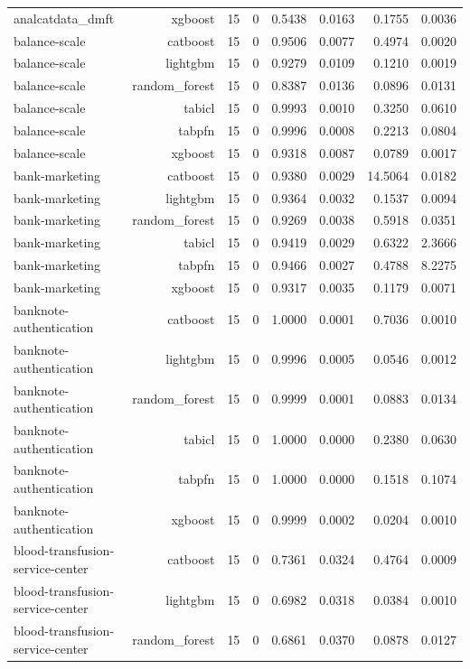 \begin{table}[htbp]
\begin{tabular}{lrrrrrrr}
analcatdata\_dmft & xgboost & 15 & 0 & 0.5438 & 0.0163 & 0.1755 & 0.0036 \\
balance-scale & catboost & 15 & 0 & 0.9506 & 0.0077 & 0.4974 & 0.0020 \\
balance-scale & lightgbm & 15 & 0 & 0.9279 & 0.0109 & 0.1210 & 0.0019 \\
balance-scale & random\_forest & 15 & 0 & 0.8387 & 0.0136 & 0.0896 & 0.0131 \\
balance-scale & tabicl & 15 & 0 & 0.9993 & 0.0010 & 0.3250 & 0.0610 \\
balance-scale & tabpfn & 15 & 0 & 0.9996 & 0.0008 & 0.2213 & 0.0804 \\
balance-scale & xgboost & 15 & 0 & 0.9318 & 0.0087 & 0.0789 & 0.0017 \\
bank-marketing & catboost & 15 & 0 & 0.9380 & 0.0029 & 14.5064 & 0.0182 \\
bank-marketing & lightgbm & 15 & 0 & 0.9364 & 0.0032 & 0.1537 & 0.0094 \\
bank-marketing & random\_forest & 15 & 0 & 0.9269 & 0.0038 & 0.5918 & 0.0351 \\
bank-marketing & tabicl & 15 & 0 & 0.9419 & 0.0029 & 0.6322 & 2.3666 \\
bank-marketing & tabpfn & 15 & 0 & 0.9466 & 0.0027 & 0.4788 & 8.2275 \\
bank-marketing & xgboost & 15 & 0 & 0.9317 & 0.0035 & 0.1179 & 0.0071 \\
banknote-authentication & catboost & 15 & 0 & 1.0000 & 0.0001 & 0.7036 & 0.0010 \\
banknote-authentication & lightgbm & 15 & 0 & 0.9996 & 0.0005 & 0.0546 & 0.0012 \\
banknote-authentication & random\_forest & 15 & 0 & 0.9999 & 0.0001 & 0.0883 & 0.0134 \\
banknote-authentication & tabicl & 15 & 0 & 1.0000 & 0.0000 & 0.2380 & 0.0630 \\
banknote-authentication & tabpfn & 15 & 0 & 1.0000 & 0.0000 & 0.1518 & 0.1074 \\
banknote-authentication & xgboost & 15 & 0 & 0.9999 & 0.0002 & 0.0204 & 0.0010 \\
blood-transfusion-service-center & catboost & 15 & 0 & 0.7361 & 0.0324 & 0.4764 & 0.0009 \\
blood-transfusion-service-center & lightgbm & 15 & 0 & 0.6982 & 0.0318 & 0.0384 & 0.0010 \\
blood-transfusion-service-center & random\_forest & 15 & 0 & 0.6861 & 0.0370 & 0.0878 & 0.0127 \\

\end{tabular}
\end{table}
